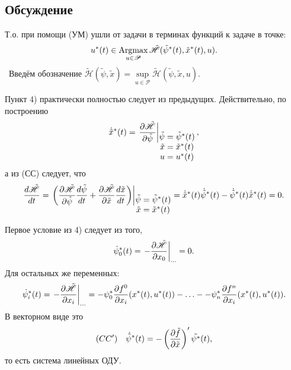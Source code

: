 \subsection*{Обсуждение}

\begin{remark}
    Т.о. при помощи (УМ) ушли от задачи в терминах функций к задаче в точке:
    $$
        u^*(t) \in \operatorname*{\mathrm{Argmax}}\limits_{u \in \mathscr{P}} \tilde{\mathscr{H}}(\tilde{\psi}^*(t), \tilde{x}^*(t), u).
    $$
     Введём обозначение $\tilde{\mathscr{H}}(\tilde{\psi}, \tilde{x}) = \sup\limits_{u \in \mathscr{P}} \tilde{\mathscr{H}}(\tilde{\psi}, \tilde{x}, u)$.
\end{remark}

\begin{remark}
    Пункт 4) практически полностью следует из предыдущих. Действительно, по построению
    $$
        \dot{\tilde{x}}^*(t) = \left. \frac{\partial \tilde{\mathscr{H}}}{\partial \tilde{\psi}} \right|_{\begin{matrix} \tilde{\psi} = \tilde{\psi}^*(t) \\ \tilde{x} = \tilde{x}^*(t) \\ u = u^*(t) \end{matrix}},
    $$
    а из (СС) следует, что
    $$
    \frac{d \tilde{\mathscr{H}}}{d t} = \left.\left(\frac{\partial \tilde{\mathscr{H}}}{\partial \tilde{\psi}} \frac{d \tilde{\psi}}{d t} + \frac{\partial \tilde{\mathscr{H}}}{\partial \tilde{x}} \frac{d \tilde{x}}{d t} \right)\right|_{\begin{matrix} \tilde{\psi} = \tilde{\psi}^*(t) \\ \tilde{x} = \tilde{x}^*(t) \end{matrix}} = \dot{\tilde{x}}^*(t) \dot{\tilde{\psi}}^*(t) - \dot{\tilde{\psi}}^*(t) \dot{\tilde{x}}^*(t) = 0.
    $$

    Первое условие из 4) следует из того,
    $$
        \dot{\psi}_0^*(t) = \left. -\frac{\partial \tilde{\mathscr{H}}}{\partial x_0} \right|_{\ldots} = 0.
    $$
    Для остальных же переменных:
    $$
        \dot{\psi}_i^*(t) = \left. -\frac{\partial \tilde{\mathscr{H}}}{\partial x_i} \right|_{\ldots} = -\psi_0^* \dfrac{\partial f^0}{\partial x_i} (x^*(t), u^*(t)) - \ldots - -\psi_n^* \dfrac{\partial f^n}{\partial x_i} (x^*(t), u^*(t)).
    $$
    В векторном виде это
    $$
        (CC') \quad \dot{\tilde{\psi}}^*(t) = - \left( \dfrac{\partial \tilde{f}}{\partial \tilde{x}} \right)' \tilde{\psi^*}(t),
    $$
    то есть система линейных ОДУ.
\end{remark}

